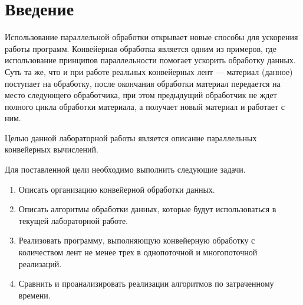 \chapter*{Введение}

Использование параллельной обработки открывает новые способы для ускорения работы программ.
Конвейерная обработка является одним из примеров, где использование принципов параллельности помогает ускорить обработку данных. 
Суть та же, что и при работе реальных конвейерных лент --- материал (данное) поступает на обработку, после окончания обработки материал передается на место следующего обработчика, при этом предыдущий обработчик не ждет полного цикла обработки материала, а получает новый материал и работает с ним.

Целью данной лабораторной работы является описание параллельных конвейерных вычислений.

Для поставленной цели необходимо выполнить следующие задачи.
\begin{enumerate}
	\item Описать организацию конвейерной обработки данных.
	\item Описать алгоритмы обработки данных, которые будут использоваться в текущей лабораторной работе.
	\item Реализовать программу, выполняющую конвейерную обработку с количеством лент не менее трех в однопоточной и многопоточной реализаций.
	\item Сравнить и проанализировать реализации алгоритмов по затраченному времени.
\end{enumerate}